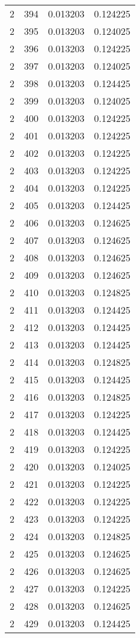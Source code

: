 \begin{longtable}{rrrr}
2 & 394 & 0.013203 & 0.124225 \\
2 & 395 & 0.013203 & 0.124025 \\
2 & 396 & 0.013203 & 0.124225 \\
2 & 397 & 0.013203 & 0.124025 \\
2 & 398 & 0.013203 & 0.124425 \\
2 & 399 & 0.013203 & 0.124025 \\
2 & 400 & 0.013203 & 0.124225 \\
2 & 401 & 0.013203 & 0.124225 \\
2 & 402 & 0.013203 & 0.124225 \\
2 & 403 & 0.013203 & 0.124225 \\
2 & 404 & 0.013203 & 0.124225 \\
2 & 405 & 0.013203 & 0.124425 \\
2 & 406 & 0.013203 & 0.124625 \\
2 & 407 & 0.013203 & 0.124625 \\
2 & 408 & 0.013203 & 0.124625 \\
2 & 409 & 0.013203 & 0.124625 \\
2 & 410 & 0.013203 & 0.124825 \\
2 & 411 & 0.013203 & 0.124425 \\
2 & 412 & 0.013203 & 0.124425 \\
2 & 413 & 0.013203 & 0.124425 \\
2 & 414 & 0.013203 & 0.124825 \\
2 & 415 & 0.013203 & 0.124425 \\
2 & 416 & 0.013203 & 0.124825 \\
2 & 417 & 0.013203 & 0.124225 \\
2 & 418 & 0.013203 & 0.124425 \\
2 & 419 & 0.013203 & 0.124225 \\
2 & 420 & 0.013203 & 0.124025 \\
2 & 421 & 0.013203 & 0.124225 \\
2 & 422 & 0.013203 & 0.124225 \\
2 & 423 & 0.013203 & 0.124225 \\
2 & 424 & 0.013203 & 0.124825 \\
2 & 425 & 0.013203 & 0.124625 \\
2 & 426 & 0.013203 & 0.124625 \\
2 & 427 & 0.013203 & 0.124225 \\
2 & 428 & 0.013203 & 0.124625 \\
2 & 429 & 0.013203 & 0.124425 \\

\end{longtable}
